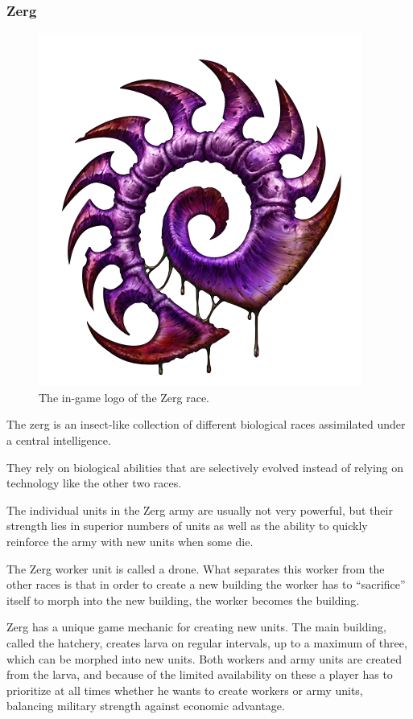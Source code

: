 \subsubsection{Zerg}
\begin{figure}[h!tb]
\centering
\includegraphics[scale=0.3]{graphics/zergicon.png}
\caption{The in-game logo of the Zerg race.\cite{zerglogo}}
\end{figure}

The zerg is an insect-like collection of different biological races assimilated under a central intelligence.

They rely on biological abilities that are selectively evolved instead of relying on technology like the other two races.

The individual units in the Zerg army are usually not very powerful, but their strength lies in superior numbers of units as well as the ability to quickly reinforce the army with new units when some die.

The Zerg worker unit is called a drone. What separates this worker from the other races is that in order to create a new building the worker has to ``sacrifice'' itself to morph into the new building, the worker becomes the building.

Zerg has a unique game mechanic for creating new units. The main building, called the hatchery, creates larva on regular intervals, up to a maximum of three, which can be morphed into new units. Both workers and army units are created from the larva, and because of the limited availability on these a player has to prioritize at all times whether he wants to create workers or army units, balancing military strength against economic advantage.

